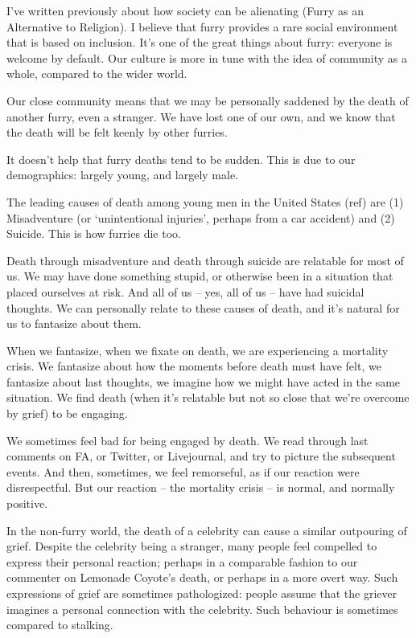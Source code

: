 I've written previously about how society can be alienating (Furry as an Alternative to Religion). I believe that furry provides a rare social environment that is based on inclusion. It's one of the great things about furry: everyone is welcome by default. Our culture is more in tune with the idea of community as a whole, compared to the wider world.

Our close community means that we may be personally saddened by the death of another furry, even a stranger. We have lost one of our own, and we know that the death will be felt keenly by other furries.

It doesn't help that furry deaths tend to be sudden. This is due to our demographics: largely young, and largely male.

The leading causes of death among young men in the United States (ref) are (1) Misadventure (or `unintentional injuries', perhaps from a car accident) and (2) Suicide. This is how furries die too.

Death through misadventure and death through suicide are relatable for most of us. We may have done something stupid, or otherwise been in a situation that placed ourselves at risk. And all of us -- yes, all of us -- have had suicidal thoughts. We can personally relate to these causes of death, and it's natural for us to fantasize about them.

When we fantasize, when we fixate on death, we are experiencing a mortality crisis. We fantasize about how the moments before death must have felt, we fantasize about last thoughts, we imagine how we might have acted in the same situation. We find death (when it's relatable but not so close that we're overcome by grief) to be engaging.

We sometimes feel bad for being engaged by death. We read through last comments on FA, or Twitter, or Livejournal, and try to picture the subsequent events. And then, sometimes, we feel remorseful, as if our reaction were disrespectful. But our reaction -- the mortality crisis -- is normal, and normally positive.

In the non-furry world, the death of a celebrity can cause a similar outpouring of grief. Despite the celebrity being a stranger, many people feel compelled to express their personal reaction; perhaps in a comparable fashion to our commenter on Lemonade Coyote's death, or perhaps in a more overt way. Such expressions of grief are sometimes pathologized: people assume that the griever imagines a personal connection with the celebrity. Such behaviour is sometimes compared to stalking.

